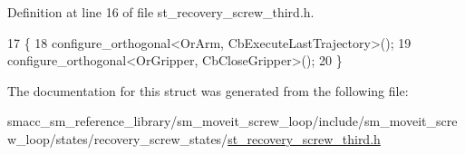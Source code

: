 Definition at line 16 of file st\+\_\+recovery\+\_\+screw\+\_\+third.\+h.


\begin{DoxyCode}
17             \{
18                 configure\_orthogonal<OrArm, CbExecuteLastTrajectory>();
19                 configure\_orthogonal<OrGripper, CbCloseGripper>();
20             \}
\end{DoxyCode}


The documentation for this struct was generated from the following file\+:\begin{DoxyCompactItemize}
\item 
smacc\+\_\+sm\+\_\+reference\+\_\+library/sm\+\_\+moveit\+\_\+screw\+\_\+loop/include/sm\+\_\+moveit\+\_\+screw\+\_\+loop/states/recovery\+\_\+screw\+\_\+states/\hyperlink{sm__moveit__screw__loop_2include_2sm__moveit__screw__loop_2states_2recovery__screw__states_2st__recovery__screw__third_8h}{st\+\_\+recovery\+\_\+screw\+\_\+third.\+h}\end{DoxyCompactItemize}
